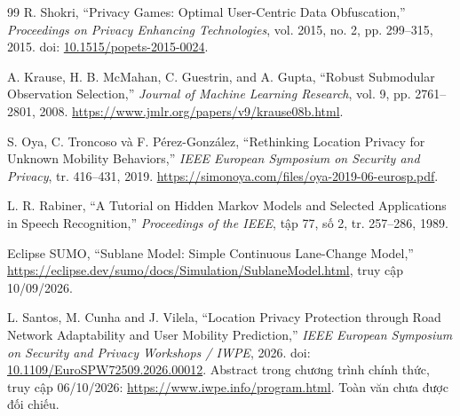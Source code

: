 \documentclass[12pt,a4paper,oneside]{report}
\begin{document}
\begin{thebibliography}{99}
R. Shokri,
``Privacy Games: Optimal User-Centric Data Obfuscation,''
\emph{Proceedings on Privacy Enhancing Technologies}, vol. 2015, no. 2,
pp. 299--315, 2015.
doi: \href{https://doi.org/10.1515/popets-2015-0024}{10.1515/popets-2015-0024}.

A. Krause, H. B. McMahan, C. Guestrin, and A. Gupta,
``Robust Submodular Observation Selection,''
\emph{Journal of Machine Learning Research}, vol. 9, pp. 2761--2801, 2008.
\url{https://www.jmlr.org/papers/v9/krause08b.html}.

S. Oya, C. Troncoso và F. Pérez-González,
``Rethinking Location Privacy for Unknown Mobility Behaviors,''
\emph{IEEE European Symposium on Security and Privacy}, tr. 416--431, 2019.
\url{https://simonoya.com/files/oya-2019-06-eurosp.pdf}.

L. R. Rabiner, ``A Tutorial on Hidden Markov Models and Selected Applications in Speech Recognition,''
\emph{Proceedings of the IEEE}, tập 77, số 2, tr. 257--286, 1989.

Eclipse SUMO, ``Sublane Model: Simple Continuous Lane-Change Model,''
\url{https://eclipse.dev/sumo/docs/Simulation/SublaneModel.html}, truy cập 10/09/2026.

L. Santos, M. Cunha and J. Vilela,
``Location Privacy Protection through Road Network Adaptability and User Mobility Prediction,''
\emph{IEEE European Symposium on Security and Privacy Workshops / IWPE}, 2026.
doi: \href{https://doi.org/10.1109/EuroSPW72509.2026.00012}{10.1109/EuroSPW72509.2026.00012}.
Abstract trong chương trình chính thức, truy cập 06/10/2026:
\url{https://www.iwpe.info/program.html}. Toàn văn chưa được đối chiếu.

\end{thebibliography}
\end{document}
